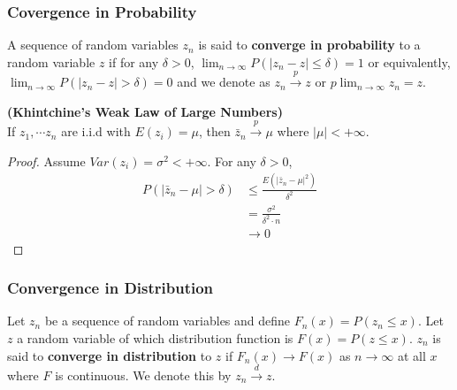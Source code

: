 \documentclass[11pt]{article} %
\theoremstyle{definition}
\numberwithin{defn}{subsection}
\numberwithin{thm}{subsection}
\numberwithin{ex}{subsection}
\begin{document}
\subsubsection{Covergence in Probability}
\begin{defn}
	A sequence of random variables $z_n$ is said to \textbf{converge in probability} to a random variable $z$ if for any $\delta>0$, $\lim_{n\rightarrow\infty}P(|z_n-z|\le\delta)=1$ or equivalently, $\lim_{n\rightarrow\infty}P(|z_n-z|>\delta)=0$ and we denote as $z_n\overset{p}{\rightarrow}z$ or $p\lim_{n\rightarrow\infty}z_n=z$.
\end{defn}

\begin{thm}\label{thm:wlln}
	\textbf{(Khintchine's Weak Law of Large Numbers)}\\
	If $z_1,\cdots z_n$ are i.i.d with $E(z_i)=\mu$, then $\bar{z}_n\overset{p}{\rightarrow}\mu$ where $|\mu|<+\infty$.
	\begin{proof}
		Assume $Var(z_i)=\sigma^2<+\infty$. For any $\delta>0$,
		\begin{align*}
		P(|\bar{z}_n-\mu|>\delta)&\le\frac{E(|\bar{z}_n-\mu|^2)}{\delta^2}\tag*{: Chebyshev's Inequality}\\
		&=\frac{\sigma^2}{\delta^2\cdot n}\\
		&\rightarrow 0\tag*{as $n\rightarrow\infty$}
		\end{align*}
	\end{proof}
\end{thm}

\subsubsection{Convergence in Distribution}
\begin{defn}
	Let $z_n$ be a sequence of random variables and define $F_n(x)=P(z_n\le x)$. Let $z$ a random variable of which distribution function is $F(x)=P(z\le x)$. $z_n$ is said to \textbf{converge in distribution} to $z$ if $F_n(x)\rightarrow F(x)$ as $n\rightarrow\infty$ at all $x$ where $F$ is continuous. We denote this by $z_n\overset{d}{\rightarrow}z$.
\end{defn}
\end{document}
